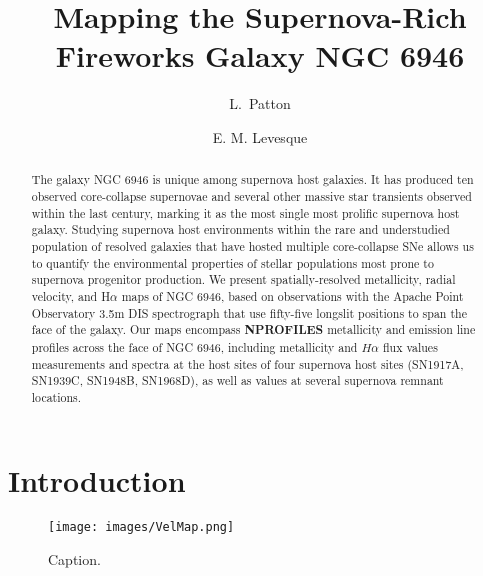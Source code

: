 \documentclass[twocolumn]{aastex61}
\begin{document}
\title{Mapping the Supernova-Rich Fireworks Galaxy NGC 6946}

\author[0000-0002-7640-236X]{L.~Patton}

\author{E. M. Levesque} %

\begin{abstract}
The galaxy NGC 6946 is unique among supernova host galaxies. It has produced ten observed core-collapse supernovae and several other massive star transients observed within the last century, marking it as the most single most prolific supernova host galaxy. Studying supernova host environments within the rare and understudied population of resolved galaxies that have hosted multiple core-collapse SNe allows us to quantify the environmental properties of stellar populations most prone to supernova progenitor production. We present spatially-resolved metallicity, radial velocity, and H$\alpha$ maps of NGC 6946, based on observations with the Apache Point Observatory 3.5m DIS spectrograph that use fifty-five longslit positions to span the face of the galaxy. Our maps encompass \textbf{NPROFILES} metallicity and emission line profiles across the face of NGC 6946, including metallicity and $H\alpha$ flux values measurements and spectra at the host sites of four supernova host sites (SN1917A, SN1939C, SN1948B, SN1968D), as well as values at several supernova remnant locations.
\end{abstract}

\section{Introduction}


\begin{figure*}
    \centering
    \texttt{[image: images/VelMap.png]}
    \caption{Caption.}
    \label{fig:VelMap}
\end{figure*}

\acknowledgments




\end{document}
